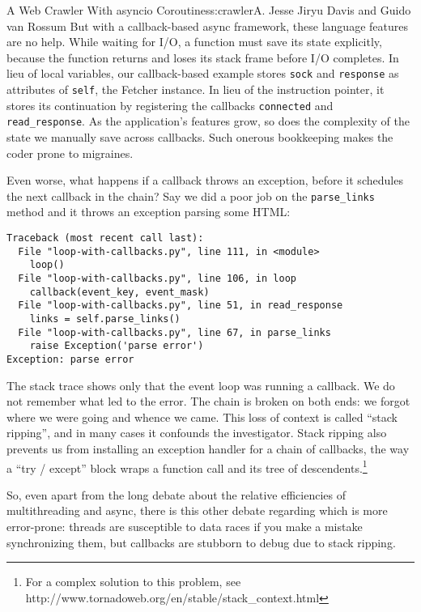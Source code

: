 \begin{aosachapter}{A Web Crawler With asyncio Coroutines}{s:crawler}{A. Jesse Jiryu Davis and Guido van Rossum}
But with a callback-based async framework, these language features are
no help. While waiting for I/O, a function must save its state
explicitly, because the function returns and loses its stack frame
before I/O completes. In lieu of local variables, our callback-based
example stores \texttt{sock} and \texttt{response} as attributes of
\texttt{self}, the Fetcher instance. In lieu of the instruction pointer,
it stores its continuation by registering the callbacks
\texttt{connected} and \texttt{read\_response}. As the application's
features grow, so does the complexity of the state we manually save
across callbacks. Such onerous bookkeeping makes the coder prone to
migraines.

Even worse, what happens if a callback throws an exception, before it
schedules the next callback in the chain? Say we did a poor job on the
\texttt{parse\_links} method and it throws an exception parsing some
HTML:

\begin{verbatim}
Traceback (most recent call last):
  File "loop-with-callbacks.py", line 111, in <module>
    loop()
  File "loop-with-callbacks.py", line 106, in loop
    callback(event_key, event_mask)
  File "loop-with-callbacks.py", line 51, in read_response
    links = self.parse_links()
  File "loop-with-callbacks.py", line 67, in parse_links
    raise Exception('parse error')
Exception: parse error
\end{verbatim}

The stack trace shows only that the event loop was running a callback.
We do not remember what led to the error. The chain is broken on both
ends: we forgot where we were going and whence we came. This loss of
context is called ``stack ripping'', and in many cases it confounds the
investigator. Stack ripping also prevents us from installing an
exception handler for a chain of callbacks, the way a ``try / except''
block wraps a function call and its tree of descendents.\footnote{For a
  complex solution to this problem, see
  http://www.tornadoweb.org/en/stable/stack\_context.html}

So, even apart from the long debate about the relative efficiencies of
multithreading and async, there is this other debate regarding which is
more error-prone: threads are susceptible to data races if you make a
mistake synchronizing them, but callbacks are stubborn to debug due to
stack ripping.

\label{coroutines}


\end{aosachapter}
